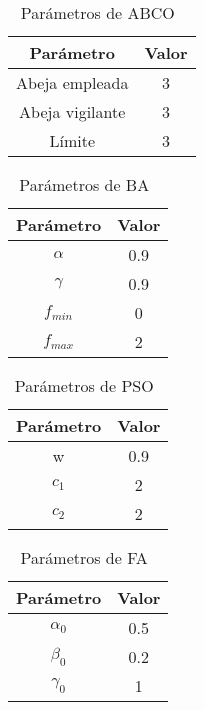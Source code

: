 \begin{table}[htp]
    \centering
    \begin{tabular}{ c c }
        \hline
        \textbf{Parámetro} & \textbf{Valor} \\
        \hline
        Abeja empleada     & 3              \\
        Abeja vigilante    & 3              \\
        Límite             & 3              \\
        \hline
    \end{tabular}
    \caption{Parámetros de ABCO~\cite{karaboga_idea_nodate}}
\end{table}

\begin{table}[htp]
    \centering
    \begin{tabular}{ c c }
        \hline
        \textbf{Parámetro} & \textbf{Valor} \\
        \hline
        $\alpha$           & 0.9            \\
        $\gamma $          & 0.9            \\
        $f_{min}$          & 0              \\
        $f_{max}$          & 2             \\
        \hline
    \end{tabular}
    \caption{Parámetros de BA~\cite{mirjalili_binary_2014}}
\end{table}

\begin{table}[htp]
    \centering
    \begin{tabular}{ c c }
        \hline
        \textbf{Parámetro} & \textbf{Valor} \\
        \hline
        w                  & 0.9            \\
        $c_1$              & 2              \\
        $c_2$              & 2              \\
        \hline
    \end{tabular}
    \caption{Parámetros de PSO~\cite{mirjalili_s-shaped_2013}}
\end{table}

\begin{table}[htp]
    \centering
    \begin{tabular}{ c c }
        \hline
        \textbf{Parámetro} & \textbf{Valor} \\
        \hline
        $\alpha_0$         & 0.5           \\
        $\beta_0$          & 0.2            \\
        $\gamma_0$         & 1              \\
        \hline
    \end{tabular}
    \caption{Parámetros de FA~\cite{zhang2016optimal}}
\end{table}

